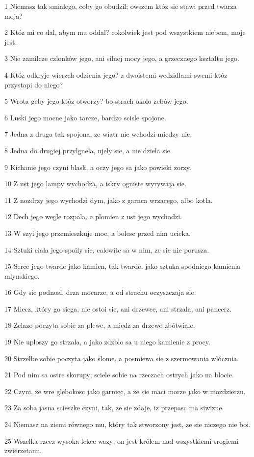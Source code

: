 \par 1 Niemasz tak smialego, coby go obudzil; owszem któz sie stawi przed twarza moja?
\par 2 Któz mi co dal, abym mu oddal? cokolwiek jest pod wszystkiem niebem, moje jest.
\par 3 Nie zamilcze czlonków jego, ani silnej mocy jego, a grzecznego ksztaltu jego.
\par 4 Któz odkryje wierzch odzienia jego? z dwoistemi wedzidlami swemi któz przystapi do niego?
\par 5 Wrota geby jego któz otworzy? bo strach okolo zebów jego.
\par 6 Luski jego mocne jako tarcze, bardzo scisle spojone.
\par 7 Jedna z druga tak spojona, ze wiatr nie wchodzi miedzy nie.
\par 8 Jedna do drugiej przylgnela, ujely sie, a nie dziela sie.
\par 9 Kichanie jego czyni blask, a oczy jego sa jako powieki zorzy.
\par 10 Z ust jego lampy wychodza, a iskry ogniste wyrywaja sie.
\par 11 Z nozdrzy jego wychodzi dym, jako z garnca wrzacego, albo kotla.
\par 12 Dech jego wegle rozpala, a plomien z ust jego wychodzi.
\par 13 W szyi jego przemieszkuje moc, a bolesc przed nim ucieka.
\par 14 Sztuki ciala jego spoily sie, calowite sa w nim, ze sie nie porusza.
\par 15 Serce jego twarde jako kamien, tak twarde, jako sztuka spodniego kamienia mlynskiego.
\par 16 Gdy sie podnosi, drza mocarze, a od strachu oczyszczaja sie.
\par 17 Miecz, który go siega, nie ostoi sie, ani drzewce, ani strzala, ani pancerz.
\par 18 Zelazo poczyta sobie za plewe, a miedz za drzewo zbótwiale.
\par 19 Nie uploszy go strzala, a jako zdzblo sa u niego kamienie z procy.
\par 20 Strzelbe sobie poczyta jako slome, a posmiewa sie z szermowania wlócznia.
\par 21 Pod nim sa ostre skorupy; sciele sobie na rzeczach ostrych jako na blocie.
\par 22 Czyni, ze wre glebokosc jako garniec, a ze sie maci morze jako w mozdzierzu.
\par 23 Za soba jasna scieszke czyni, tak, ze sie zdaje, iz przepasc ma siwizne.
\par 24 Niemasz na ziemi równego mu, który tak stworzony jest, ze sie niczego nie boi.
\par 25 Wszelka rzecz wysoka lekce wazy; on jest królem nad wszystkiemi srogiemi zwierzetami.

